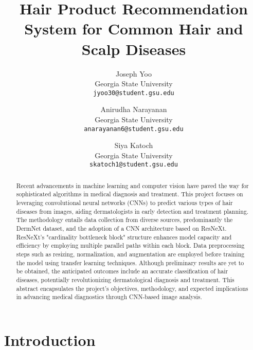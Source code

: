 \documentclass[10pt,twocolumn,letterpaper]{article}
\begin{document}
\title{Hair Product Recommendation System for Common Hair and Scalp Diseases}

\author{Joseph Yoo\\
Georgia State University\\
{\tt\small jyoo30@student.gsu.edu}
\and
Anirudha Narayanan\\
Georgia State University\\
{\tt\small anarayanan6@student.gsu.edu}
\and
Siya Katoch\\
Georgia State University\\
{\tt\small skatoch1@student.gsu.edu}
}


\maketitle

\begin{abstract}
Recent advancements in machine learning and computer vision have paved the way for sophisticated algorithms in medical diagnosis and treatment. This project focuses on leveraging convolutional neural networks (CNNs) to predict various types of hair diseases from images, aiding dermatologists in early detection and treatment planning. The methodology entails data collection from diverse sources, predominantly the DermNet dataset, and the adoption of a CNN architecture based on ResNeXt. ResNeXt's "cardinality bottleneck block" structure enhances model capacity and efficiency by employing multiple parallel paths within each block. Data preprocessing steps such as resizing, normalization, and augmentation are employed before training the model using transfer learning techniques. Although preliminary results are yet to be obtained, the anticipated outcomes include an accurate classification of hair diseases, potentially revolutionizing dermatological diagnosis and treatment. This abstract encapsulates the project's objectives, methodology, and expected implications in advancing medical diagnostics through CNN-based image analysis.
\end{abstract}

\section{Introduction}
\end{document}

